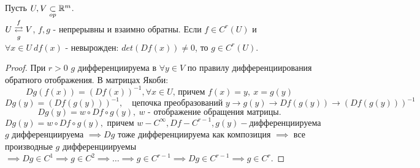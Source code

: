 \begin{theorem}
    Пусть $U, V \underset{op}{\subset} \mathbb{R}^m$. \\
    $U \overunderset{f}{g}{\rightleftarrows} V$, $f, g$ - непрерывны и взаимно обратны. Если $f \in C^r(U)$ и $\forall x \in U \ df(x)$ - невырожден: $det(Df(x)) \neq 0$, то $g \in C^r(U)$.
    \begin{proof}
        При $r > 0$  $g$ дифференциируема в $\forall y \in V$ по правилу дифференциирования обратного отображения. В матрицах Якоби:
        \[Dg(f(x)) = (Df(x))^{-1}, \forall x \in U \text{, причем } f(x) = y, \ x = g(y)\]
        \[Dg(y) = (Df(g(y)))^{-1}, \quad \text{цепочка преобразований } y \to g(y) \to Df(g(y)) \to (Df(g(y)))^{-1}\]
        \[Dg(y) = w \circ Df \circ g(y), \ w \text{ - отображение обращения матрицы.}\]
        \[Dg(y) = w \circ Df \circ g(y), \text{ причем } w - C^{\infty}, Df - C^{r-1}, g(y) - \text{дифференциируема}\]
        $g$ дифференциируема $\implies Dg$ тоже дифференциируема как композиция $\implies$ все производные $g$ дифференциируемы $\implies Dg \in C^1 \implies g \in C^2 \implies \hdots \implies g \in C^{r-1} \implies Dg \in C^{r-1} \implies g \in C^r$.
    \end{proof} 
\end{theorem}

